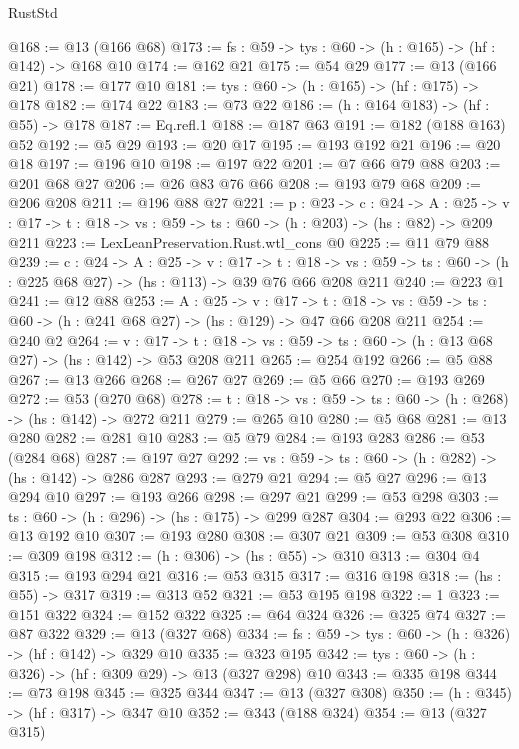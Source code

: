 \begin{lexlean}{RustStd}
\begin{coremodule}
@168 := @13 (@166 @68)
@173 := {fs : @59} -> {tys : @60} -> (h : @165) -> (hf : @142) -> @168 @10
@174 := @162 @21
@175 := @54 @29
@177 := @13 (@166 @21)
@178 := @177 @10
@181 := {tys : @60} -> (h : @165) -> (hf : @175) -> @178
@182 := @174 @22
@183 := @73 @22
@186 := (h : @164 @183) -> (hf : @55) -> @178
@187 := Eq.refl.{1}
@188 := @187 @63
@191 := @182 (@188 @163) @52
@192 := @5 @29
@193 := @20 @17
@195 := @193 @192 @21
@196 := @20 @18
@197 := @196 @10
@198 := @197 @22
@201 := @7 @66 @79 @88
@203 := @201 @68 @27
@206 := @26 @83 @76 @66
@208 := @193 @79 @68
@209 := @206 @208
@211 := @196 @88 @27
@221 := {p : @23} ->
  {c : @24} ->
  {A : @25} ->
  {v : @17} -> {t : @18} -> {vs : @59} -> {ts : @60} -> (h : @203) -> (hs : @82) -> @209 @211
@223 := LexLeanPreservation.Rust.wtl_cons @0
@225 := @11 @79 @88
@239 := {c : @24} ->
  {A : @25} ->
  {v : @17} ->
  {t : @18} ->
  {vs : @59} -> {ts : @60} -> (h : @225 @68 @27) -> (hs : @113) -> @39 @76 @66 @208 @211
@240 := @223 @1
@241 := @12 @88
@253 := {A : @25} ->
  {v : @17} ->
  {t : @18} -> {vs : @59} -> {ts : @60} -> (h : @241 @68 @27) -> (hs : @129) -> @47 @66 @208 @211
@254 := @240 @2
@264 := {v : @17} ->
  {t : @18} -> {vs : @59} -> {ts : @60} -> (h : @13 @68 @27) -> (hs : @142) -> @53 @208 @211
@265 := @254 @192
@266 := @5 @88
@267 := @13 @266
@268 := @267 @27
@269 := @5 @66
@270 := @193 @269
@272 := @53 (@270 @68)
@278 := {t : @18} -> {vs : @59} -> {ts : @60} -> (h : @268) -> (hs : @142) -> @272 @211
@279 := @265 @10
@280 := @5 @68
@281 := @13 @280
@282 := @281 @10
@283 := @5 @79
@284 := @193 @283
@286 := @53 (@284 @68)
@287 := @197 @27
@292 := {vs : @59} -> {ts : @60} -> (h : @282) -> (hs : @142) -> @286 @287
@293 := @279 @21
@294 := @5 @27
@296 := @13 @294 @10
@297 := @193 @266
@298 := @297 @21
@299 := @53 @298
@303 := {ts : @60} -> (h : @296) -> (hs : @175) -> @299 @287
@304 := @293 @22
@306 := @13 @192 @10
@307 := @193 @280
@308 := @307 @21
@309 := @53 @308
@310 := @309 @198
@312 := (h : @306) -> (hs : @55) -> @310
@313 := @304 @4
@315 := @193 @294 @21
@316 := @53 @315
@317 := @316 @198
@318 := (hs : @55) -> @317
@319 := @313 @52
@321 := @53 @195 @198
@322 := 1
@323 := @151 @322
@324 := @152 @322
@325 := @64 @324
@326 := @325 @74
@327 := @87 @322
@329 := @13 (@327 @68)
@334 := {fs : @59} -> {tys : @60} -> (h : @326) -> (hf : @142) -> @329 @10
@335 := @323 @195
@342 := {tys : @60} -> (h : @326) -> (hf : @309 @29) -> @13 (@327 @298) @10
@343 := @335 @198
@344 := @73 @198
@345 := @325 @344
@347 := @13 (@327 @308)
@350 := (h : @345) -> (hf : @317) -> @347 @10
@352 := @343 (@188 @324)
@354 := @13 (@327 @315)

\end{coremodule}
\end{lexlean}
